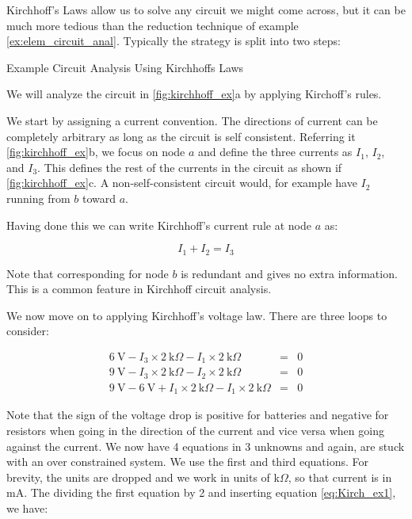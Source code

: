 \documentclass{tufte-book}
\begin{document}
Kirchhoff's Laws allow us to solve any circuit we might come across, but it can be much more tedious than the reduction technique of example \ref{ex:elem_circuit_anal}. Typically the strategy is split into two steps:

\begin{myexample}[label = ex:kirchhoff_calculation]{Example Circuit Analysis Using Kirchhoffs Laws}

We will analyze the circuit in \ref{fig:kirchhoff_ex}a by applying Kirchoff's rules. 

\noindent We start by assigning a current convention. The directions of current can be completely arbitrary as long as the circuit is self consistent. Referring it \ref{fig:kirchhoff_ex}b, we focus on node $a$ and define the three currents as $I_1$, $I_2$, and $I_3$. This defines the rest of the currents in the circuit as shown if \ref{fig:kirchhoff_ex}c. A non-self-consistent circuit would, for example have $I_2$ running from $b$ toward $a$. 

Having done this we can write Kirchhoff's current rule at node $a$ as:

\begin{equation}\label{eq:Kirch_ex1}
I_1+I_2 = I_3
\end{equation}

\noindent Note that corresponding for node $b$ is redundant and gives no extra information. This is a common feature in Kirchhoff circuit analysis.

We now move on to applying Kirchhoff's voltage law. There are three loops to consider:

\begin{eqnarray}\label{eq:Kirch_ex2}
6~\text{V} - I_3\times2~\text{k}\Omega - I_1\times2~\text{k}\Omega &=& 0 \nonumber\\
9~\text{V} - I_3\times2~\text{k}\Omega - I_2\times2~\text{k}\Omega &=& 0 \nonumber\\
9~\text{V}-6~\text{V} +I_1\times2~\text{k}\Omega - I_1\times2~\text{k}\Omega &=& 0 
\end{eqnarray}


\noindent Note that the sign of the voltage drop is positive for batteries and negative for resistors when going in the direction of the current and vice versa when going against the current. We now have 4 equations in 3 unknowns and again, are stuck with an over constrained system. We use the first and third equations. For brevity, the units are dropped and we work in units of k$\Omega$, so that current is in mA. The dividing the first equation by 2 and inserting equation \ref{eq:Kirch_ex1}, we have:


\end{myexample}
\end{document}
